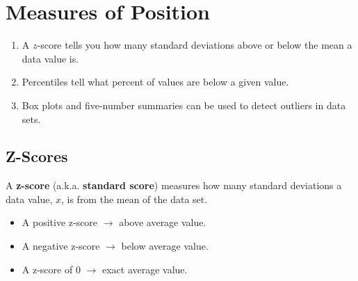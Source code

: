 \documentclass{article}
\begin{document}
\section*{Measures of Position}

\begin{tcolorbox}[colframe=orange!70!white, coltitle=black, title=\textbf{Summary}]
\begin{enumerate}
    \item A $z$-score tells you how many standard deviations above or below the mean a data value is.
    \item Percentiles tell what percent of values are below a given value.
    \item Box plots and five-number summaries can be used to detect outliers in data sets.
\end{enumerate}
\end{tcolorbox}
\vspace{0.75in}

\subsection*{Z-Scores}
\vspace{0.25in}

\begin{tcolorbox}[colframe=green!20!black, colback = green!30!white,title=\textbf{z-score}]
A \textbf{z-score} (a.k.a. \textbf{standard score}) measures how many standard deviations a data value, $x$, is from the mean of the data set.
\end{tcolorbox}
\vspace{8pt}	
\begin{itemize}
	\item A positive z-score $\rightarrow$ above average value.
	\item A negative z-score $\rightarrow$ below average value.
	\item A z-score of 0 $\rightarrow$ exact average value.
\end{itemize}
\vspace{0.25in}
\end{document}
